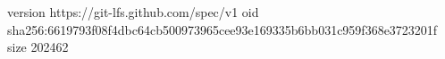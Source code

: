 version https://git-lfs.github.com/spec/v1
oid sha256:6619793f08f4dbc64cb500973965cee93e169335b6bb031c959f368e3723201f
size 202462
